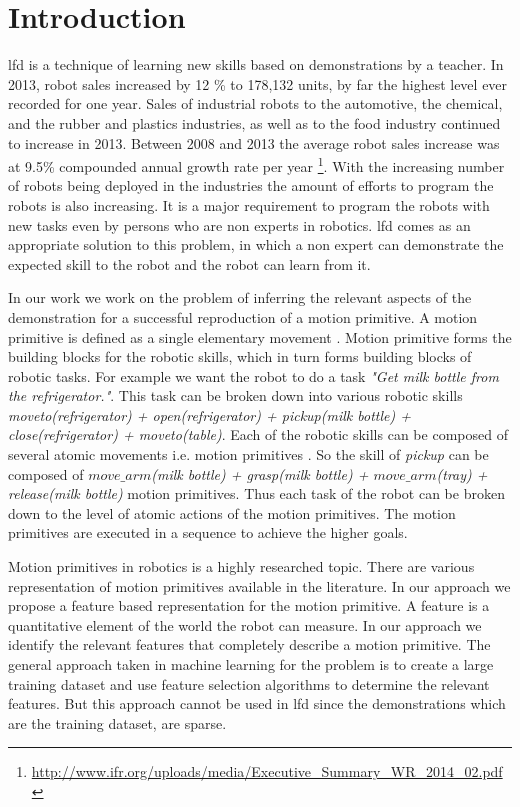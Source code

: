 \section{Introduction} 
\acrfull{lfd} is a technique of learning new skills based on
demonstrations by a teacher\cite{argall_survey_2009}. In 2013, robot sales
increased by 12 \% to 178,132 units, by far the highest level ever recorded for
one year. Sales of industrial robots to the automotive, the chemical, and the
rubber and plastics industries, as well as to the food industry continued to
increase in 2013. Between 2008 and 2013 the average robot sales increase was at
9.5\% compounded annual growth rate per year
\footnote{\url{http://www.ifr.org/uploads/media/Executive_Summary_WR_2014_02.pdf
}}. With the increasing number of robots being deployed in the industries the
amount of efforts to program the robots is also increasing. It is a major
requirement to program the robots with new tasks even by persons who are non
experts in robotics. \acrshort{lfd} comes as an appropriate solution to this problem, in
which a non expert can demonstrate the expected skill to the robot and the
robot can learn from it.


In our work we work on the problem of inferring the relevant aspects of the
demonstration for a successful reproduction of a motion primitive. A motion
primitive is defined as a single elementary movement
\cite{schaal_nonlinear_2000}. Motion primitive forms the building blocks for
the robotic skills, which in turn forms building blocks of robotic tasks. For
example we want the robot to do a task \textit{"Get milk bottle from the
refrigerator."}. This task can be broken down into various robotic skills
\textit{moveto(refrigerator) + open(refrigerator) + pickup(milk bottle) +
close(refrigerator) + moveto(table)}. Each of the robotic skills can be
composed of several atomic movements i.e. motion primitives . So the skill of
\textit{pickup} can be composed of \textit{$move\_arm$(milk bottle) + grasp(milk
bottle) + $move\_arm$(tray) + release(milk bottle)} motion primitives. Thus each
task of the robot can be broken down to the level of atomic actions of the
motion primitives. The motion primitives are executed in a sequence to achieve
the higher goals.

Motion primitives in robotics is a highly researched topic. There are various
representation of motion primitives available in the literature. In our
approach we propose a feature based representation for the motion primitive. A
feature is a quantitative element of the world the robot can measure. In our
approach we identify the relevant features that completely describe a motion
primitive. The general approach taken in machine learning for the problem is to
create a large training dataset and use feature selection algorithms to
determine the relevant features. But this approach cannot be used in \acrshort{lfd} since
the demonstrations which are the training dataset, are sparse.


